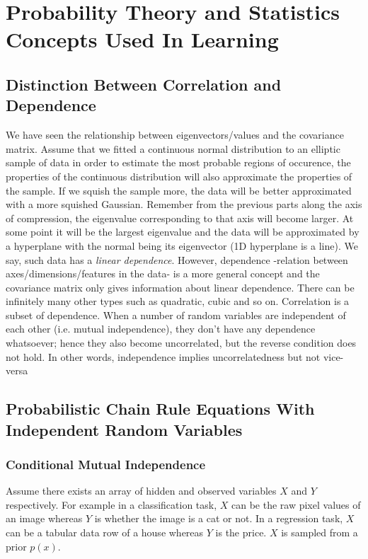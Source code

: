\documentclass{article}
\numberwithin{equation}{subsection}
\begin{document}
\section{Probability Theory and Statistics Concepts Used In Learning}
\subsection{Distinction Between Correlation and Dependence}
\label{cor_dep}
We have seen the relationship between eigenvectors/values and the covariance matrix. Assume that we fitted a continuous normal distribution to an elliptic
sample of data in order to estimate the most probable regions of occurence, the properties of the continuous distribution will also approximate the properties of the sample. If we squish the sample more, the data will be better approximated with a more squished Gaussian. Remember from the previous parts along the axis of compression, the eigenvalue corresponding to that axis will become larger. At some point it will be the largest eigenvalue and the data will be approximated by a hyperplane with the normal being its eigenvector (1D hyperplane is a line). We say, such data has a \textit{linear dependence}. However, dependence -relation between axes/dimensions/features in the data- is a more general concept and the covariance matrix only gives information about linear dependence. There can be infinitely many other types such as quadratic, cubic and so on. Correlation is a subset of dependence. When a number of random variables are independent of each other (i.e. mutual independence), they don't have any dependence whatsoever; hence they also become uncorrelated, but the reverse condition does not hold. In other words, independence implies uncorrelatedness but not vice-versa
\subsection{Probabilistic Chain Rule Equations With Independent Random Variables}
\subsubsection{Conditional Mutual Independence}
\label{cond_mutual_independence}
Assume there exists an array of hidden and observed variables $X$ and $Y$ respectively. For example in a classification task, $X$ can be the raw pixel values of an image whereas $Y$ is whether the image is a cat or not. In a regression task, $X$ can be a tabular data row of a house whereas $Y$ is the price. $X$ is sampled from a prior $p(x)$.
\end{document}
